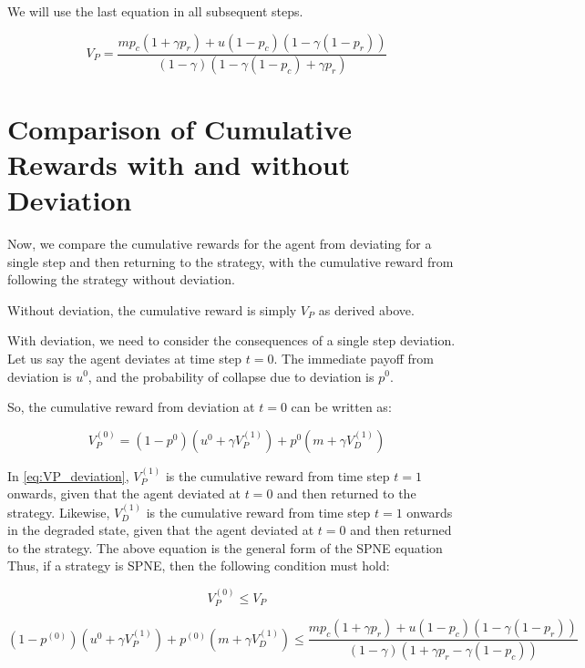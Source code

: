 \documentclass{article}
\begin{document}
We will use the last equation in all subsequent steps.

\begin{equation}
    V_{P} = \frac{m p_{c} \left(1 + \gamma p_{r}\right) + u \left(1 - p_{c}\right) \left(1 - \gamma \left(1 - p_{r}\right)\right)}{\left(1 - \gamma\right) \left(1 - \gamma \left(1 - p_{c}\right) + \gamma p_{r} \right)}
\end{equation}

\section{Comparison of Cumulative Rewards with and without Deviation}

Now, we compare the cumulative rewards for the agent from deviating for a single step and then returning to the strategy, 
with the cumulative reward from following the strategy without deviation.


Without deviation, the cumulative reward is simply $V_P$ as derived above.

With deviation, we need to consider the consequences of a single step deviation. Let us say the agent deviates at time step $t=0$. 
The immediate payoff from deviation is $u^0$, and the probability of collapse due to deviation is $p^0$.

So, the cumulative reward from deviation at $t=0$ can be written as:

\begin{equation}\label{eq:VP_deviation}
    V_P^{(0)} = (1-p^0)(u^0 + \gamma V_P^{(1)}) + p^0(m + \gamma V_D^{(1)})
\end{equation}

In \ref{eq:VP_deviation}, $V_P^{(1)}$ is the cumulative reward from time step $t=1$ onwards, given that the agent deviated at $t=0$ and then returned to the strategy.
Likewise, $V_D^{(1)}$ is the cumulative reward from time step $t=1$ onwards in the degraded state, given that the agent deviated at $t=0$ and then returned to the strategy.
The above equation is the general form of the SPNE equation
Thus, if a strategy is SPNE, then the following condition must hold:

\begin{equation}\label{eq:SPNE_inequality}
    V_P^{(0)} \leq V_P 
\end{equation}

\begin{equation}
\boxed{
(1-p^{(0)})(u^0 + \gamma V_P^{(1)}) + p^{(0)}(m + \gamma V_D^{(1)})
\leq
\frac{m p_{c} \left(1 + \gamma p_{r}\right) + u \left(1 - p_{c}\right) \left(1 - \gamma \left(1 - p_{r}\right)\right)}
{\left(1 - \gamma\right) \left(1 + \gamma p_{r} - \gamma \left(1 - p_{c}\right) \right)}
}
\end{equation}
\end{document}
